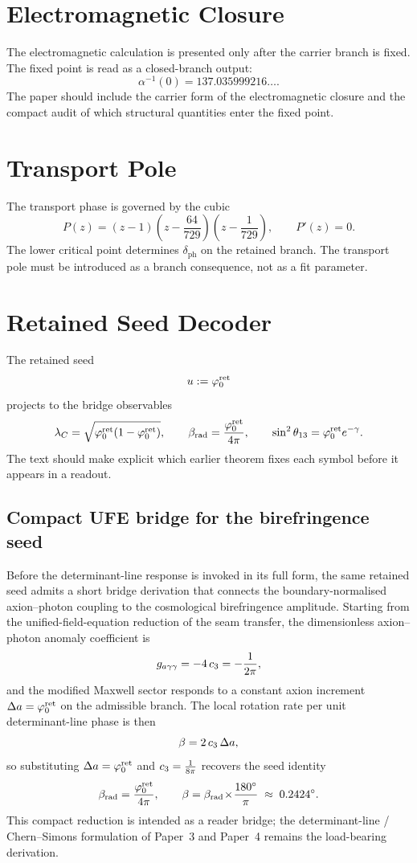 \documentclass[11pt,a4paper]{article}
\begin{document}
\tableofcontents

\section{Electromagnetic Closure}

The electromagnetic calculation is presented only after the carrier branch is fixed. The fixed
point is read as a closed-branch output:
\[
\alpha^{-1}(0)=137.035999216\ldots.
\]
The paper should include the carrier form of the electromagnetic closure and the compact audit of
which structural quantities enter the fixed point.

\section{Transport Pole}

The transport phase is governed by the cubic
\[
P(z)=(z-1)\left(z-\frac{64}{729}\right)\left(z-\frac{1}{729}\right),
\qquad
P'(z)=0.
\]
The lower critical point determines $\delta_{\mathrm{ph}}$ on the retained branch. The transport
pole must be introduced as a branch consequence, not as a fit parameter.

\section{Retained Seed Decoder}

The retained seed
\[
u:=\varphi_0^{\mathrm{ret}}
\]
projects to the bridge observables
\[
\lambda_C=\sqrt{\varphi_0^{\mathrm{ret}}(1-\varphi_0^{\mathrm{ret}})},
\qquad
\beta_{\mathrm{rad}}=\frac{\varphi_0^{\mathrm{ret}}}{4\pi},
\qquad
\sin^2\theta_{13}=\varphi_0^{\mathrm{ret}} e^{-\gamma}.
\]
The text should make explicit which earlier theorem fixes each symbol before it appears in a
readout.

\subsection{Compact UFE bridge for the birefringence seed}
\label{ssec:ufe-birefringence-bridge}

Before the determinant-line response is invoked in its full form, the same retained seed admits a
short bridge derivation that connects the boundary-normalised axion--photon coupling to the
cosmological birefringence amplitude. Starting from the unified-field-equation reduction of the
seam transfer, the dimensionless axion--photon anomaly coefficient is
\[
g_{a\gamma\gamma}=-4\,c_3=-\frac{1}{2\pi},
\]
and the modified Maxwell sector responds to a constant axion increment $\Delta a=\varphi_0^{\mathrm{ret}}$ on the
admissible branch. The local rotation rate per unit determinant-line phase is then
\[
\beta = 2\,c_3\,\Delta a,
\]
so substituting $\Delta a=\varphi_0^{\mathrm{ret}}$ and $c_3=\tfrac{1}{8\pi}$ recovers the seed identity
\begin{equation}
\label{eq:beta-rad-ufe-bridge}
\beta_{\mathrm{rad}}=\frac{\varphi_0^{\mathrm{ret}}}{4\pi},
\qquad
\beta=\beta_{\mathrm{rad}}\!\times\!\frac{180^\circ}{\pi}\;\approx\;0.2424^\circ.
\end{equation}
This compact reduction is intended as a reader bridge; the determinant-line / Chern--Simons
formulation of Paper~3 and Paper~4 remains the load-bearing derivation.
\end{document}
